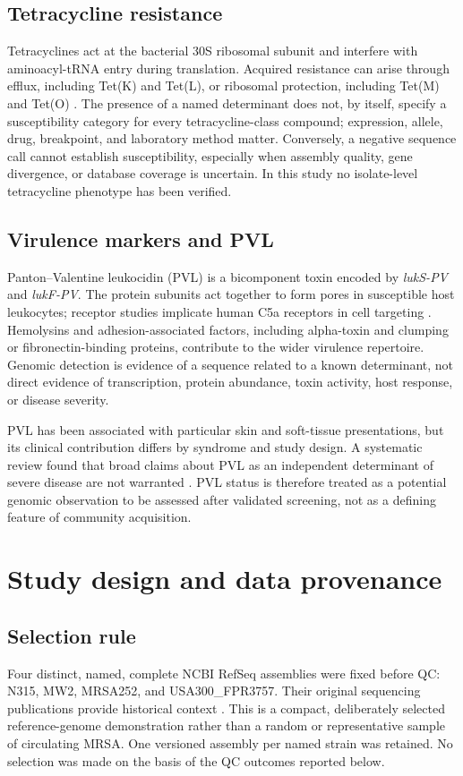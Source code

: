 \documentclass[11pt,a4paper]{article}
\begin{document}
\subsection{Tetracycline resistance}
Tetracyclines act at the bacterial 30S ribosomal subunit and interfere with aminoacyl-tRNA entry during translation. Acquired resistance can arise through efflux, including Tet(K) and Tet(L), or ribosomal protection, including Tet(M) and Tet(O) \cite{Chukwudi2016}. The presence of a named determinant does not, by itself, specify a susceptibility category for every tetracycline-class compound; expression, allele, drug, breakpoint, and laboratory method matter. Conversely, a negative sequence call cannot establish susceptibility, especially when assembly quality, gene divergence, or database coverage is uncertain. In this study no isolate-level tetracycline phenotype has been verified.

\subsection{Virulence markers and PVL}
Panton--Valentine leukocidin (PVL) is a bicomponent toxin encoded by \textit{lukS-PV} and \textit{lukF-PV}. The protein subunits act together to form pores in susceptible host leukocytes; receptor studies implicate human C5a receptors in cell targeting \cite{Aman2014,Spaan2013}. Hemolysins and adhesion-associated factors, including alpha-toxin and clumping or fibronectin-binding proteins, contribute to the wider virulence repertoire. Genomic detection is evidence of a sequence related to a known determinant, not direct evidence of transcription, protein abundance, toxin activity, host response, or disease severity.

PVL has been associated with particular skin and soft-tissue presentations, but its clinical contribution differs by syndrome and study design. A systematic review found that broad claims about PVL as an independent determinant of severe disease are not warranted \cite{Shallcross2013}. PVL status is therefore treated as a potential genomic observation to be assessed after validated screening, not as a defining feature of community acquisition.

\section{Study design and data provenance}
\subsection{Selection rule}
Four distinct, named, complete NCBI RefSeq assemblies were fixed before QC: N315, MW2, MRSA252, and USA300\_FPR3757. Their original sequencing publications provide historical context \cite{Kuroda2001,Baba2002,Holden2004,Diep2006}. This is a compact, deliberately selected reference-genome demonstration rather than a random or representative sample of circulating MRSA. One versioned assembly per named strain was retained. No selection was made on the basis of the QC outcomes reported below.
\end{document}
